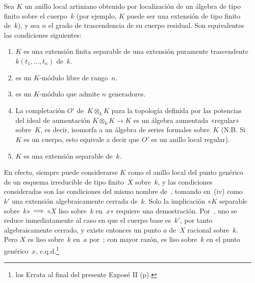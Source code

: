 \begin{corollaire}
\label{II.5.6}
Sea $K$ un anillo local artiniano obtenido por localización de un álgebra de tipo finito sobre el cuerpo~$k$ (por ejemplo, $K$ puede ser una extensión de tipo finito de~$k$), y sea $n$ el grado de trascendencia
de su cuerpo residual. Son equivalentes las condiciones siguientes:
\begin{enumerate}
\item[(i)] $K$ es una extensión finita separable de una extensión puramente trascendente $k(t_1,\dots,t_n)$ de~$k$.
\item[(ii)]
es un $K$-módulo libre de rango~$n$.
\item[(ii~bis)]
es un $K$-módulo que admite $n$ generadores.
\item[(iii)] La completación $O'$ de~$K\otimes_k K$ para la topología definida por las potencias del ideal de aumentación $K\otimes_k K\to K$ es un álgebra aumentada «regular» sobre~$K$, es decir, isomorfa a un álgebra de series formales sobre~$K$ (N.B. Si $K$ es un cuerpo, esto equivale a decir que $O'$ es un anillo local regular).
\item[(iv)] $K$ es una extensión separable de~$k$.
\end{enumerate}
\end{corollaire}

En efecto, siempre puede considerarse $K$ como el anillo local del punto genérico de un esquema irreducible de tipo finito~$X$ sobre~$k$, y las condiciones consideradas son las condiciones del mismo nombre de~, tomando en~(iv) como~$k'$ una extensión algebraicamente cerrada de~$k$. Solo la implicación «$K$ separable sobre~$k$» $\Longrightarrow$ «$X$ liso sobre~$k$ en~$x$» requiere una demostración. Por~, uno se reduce inmediatamente al caso en que el cuerpo base es~$k'$, por tanto algebraicamente cerrado, y existe entonces un punto $a$ de~$X$ racional sobre~$k$. Pero $X$ es liso sobre~$k$ en~$a$ por~; con mayor razón, es liso sobre~$k$ en el punto genérico~$x$, c.q.d.\footnote{\Cf los Errata al final del presente Exposé II (p\ptbl \pageref{II.fin.errata}).}

